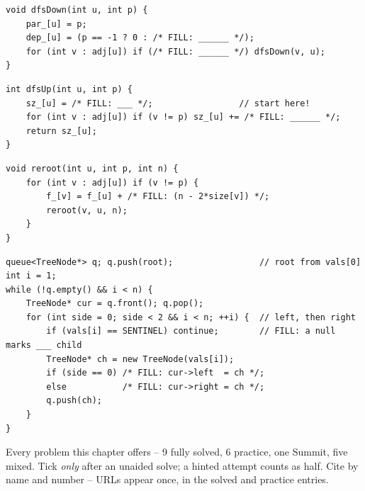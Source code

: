 \begin{lstlisting}[caption={Drill 2 -- parent-guarded rooting, down pass (from \coderef{c04-root})}]
void dfsDown(int u, int p) {
    par_[u] = p;
    dep_[u] = (p == -1 ? 0 : /* FILL: ______ */);
    for (int v : adj[u]) if (/* FILL: ______ */) dfsDown(v, u);
}
\end{lstlisting}

\begin{lstlisting}[caption={Drill 3 -- bottom-up subtree size (from \coderef{c04-root})}]
int dfsUp(int u, int p) {
    sz_[u] = /* FILL: ___ */;                 // start here!
    for (int v : adj[u]) if (v != p) sz_[u] += /* FILL: ______ */;
    return sz_[u];
}
\end{lstlisting}

\begin{lstlisting}[caption={Drill 4 -- reroot shift (from \coderef{c04-summit})}]
void reroot(int u, int p, int n) {
    for (int v : adj[u]) if (v != p) {
        f_[v] = f_[u] + /* FILL: (n - 2*size[v]) */;
        reroot(v, u, n);
    }
}
\end{lstlisting}

\begin{lstlisting}[caption={Drill 5 -- level-order array to tree (from \coderef{c04-formats})}]
queue<TreeNode*> q; q.push(root);                 // root from vals[0]
int i = 1;
while (!q.empty() && i < n) {
    TreeNode* cur = q.front(); q.pop();
    for (int side = 0; side < 2 && i < n; ++i) {  // left, then right
        if (vals[i] == SENTINEL) continue;        // FILL: a null marks ___ child
        TreeNode* ch = new TreeNode(vals[i]);
        if (side == 0) /* FILL: cur->left  = ch */;
        else           /* FILL: cur->right = ch */;
        q.push(ch);
    }
}
\end{lstlisting}


Every problem this chapter offers -- 9 fully solved, 6 practice, one Summit, five mixed.
Tick \emph{only} after an unaided solve; a hinted attempt counts as half. Cite by name and
number -- URLs appear once, in the solved and practice entries.

